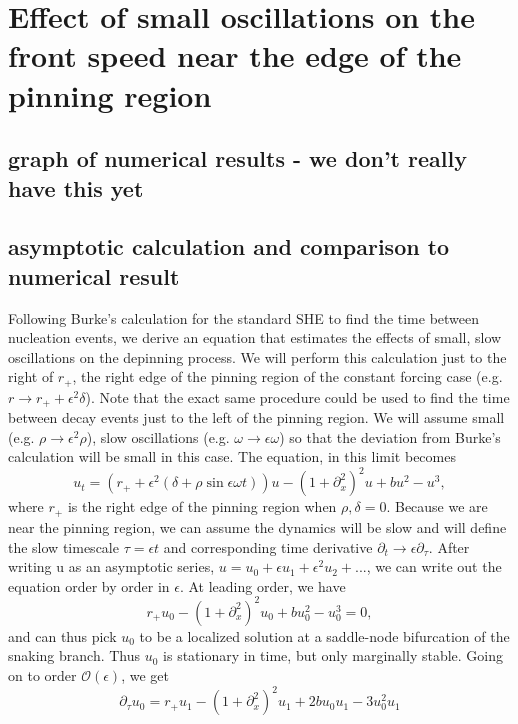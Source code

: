 \documentclass[../main/TimeForcingSHE.tex]{subfiles}
\begin{document}
\section{Effect of small oscillations on the front speed near the edge of the pinning region}
\subsection{graph of numerical results - we don't really have this yet}
\subsection{asymptotic calculation and comparison to numerical result}


Following Burke's calculation for the standard SHE to find the time between nucleation events, we derive an equation that estimates the effects of small, slow oscillations on the depinning process. We will perform this calculation just  to the right of $r_+$, the right edge of the pinning region of the constant forcing case (e.g. $r\rightarrow r_++\epsilon^2\delta$).  Note that the exact same procedure could be used to find the time between decay events just to the left of the pinning region.   We will assume small (e.g. $\rho\rightarrow \epsilon^2 \rho$), slow oscillations (e.g. $\omega\rightarrow \epsilon \omega$)  so that the deviation from Burke's calculation will be small in this case.  The equation, in this limit becomes 
\begin{equation}
u_t= \left(r_++ \epsilon^2(\delta+ \rho \sin\epsilon\omega t)\right) u-\left(1+\partial_{x}^2\right)^2u+b u^2-u^3\label{eq:SH},
\end{equation}
where $r_+$ is the right edge of the pinning region when $\rho,\delta=0$.  Because we are near the pinning region, we can assume the dynamics will be slow and will define the slow timescale $\tau=\epsilon t$ and corresponding time derivative $\partial_t\rightarrow\epsilon\partial_{\tau}$.  After writing u as an asymptotic series, $u=u_0+\epsilon u_1+\epsilon^2 u_2+...$, we can write out the equation order by order in $\epsilon$. At leading order, we have
\begin{equation}
r_+u_0-\left(1+\partial_{x}^2\right)^2u_0+b u_0^2-u_0^3=0\label{eq:SH},
\end{equation}
and can thus pick $u_0$ to be a localized solution at a saddle-node bifurcation of the snaking branch.  Thus $u_0$ is stationary in time, but only marginally stable.  Going on to order  $\mathcal{O}(\epsilon)$, we get
\begin{equation}
\partial_{\tau} u_0=r_+u_1-\left(1+\partial_{x}^2\right)^2u_1+2b u_0u_1-3u_0^2u_1\label{eq:SH}
\end{equation}
\end{document}
